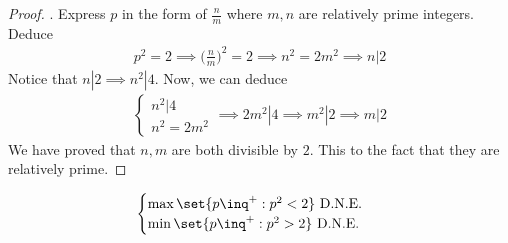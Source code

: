 \documentclass{report}
\begin{document}
\begin{proof}
. Express $p$ in the form of  $\frac{n}{m}$ where $m,n$ are relatively prime integers. Deduce 
\begin{align}
p^2=2 \implies  \Big(\frac{n}{m} \Big)^2=2 \implies n^2=2m^2 \implies n|2 
\end{align}
Notice that $n|2\implies n^2 |4$. Now, we can deduce
\begin{align}
\begin{cases}
  n^2|4\\
  n^2=2m^2
\end{cases}\implies 2m^2|4\implies m^2|2 \implies m|2
\end{align}
We have proved that $n,m$ are both divisible by  $2$. This  \CaC to the fact that they are relatively prime.
\end{proof}
\begin{theorem}
\label{1.1.3}
\begin{align*}
\begin{cases}
  \max \set{p\inq^+:p^2<2}\text{ D.N.E. }\\
  \min \set{p\inq^+:p^2>2}\text{ D.N.E. }
\end{cases}
\end{align*}
\end{theorem}
\end{document}
